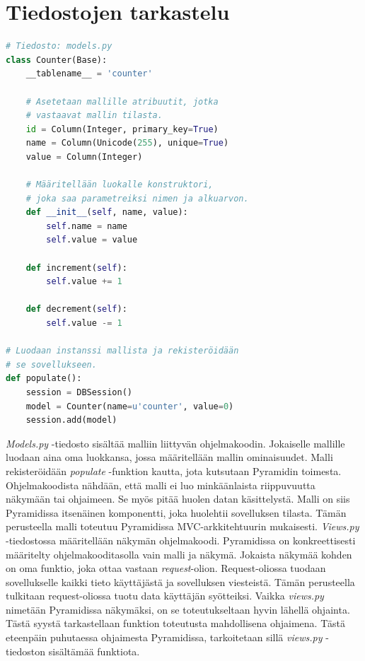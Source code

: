 \documentclass[utf8]{gradu3}
\begin{document}
\section{Tiedostojen tarkastelu}
\lstset{numbers=left}
\begin{lstlisting}[language=Python]
# Tiedosto: models.py
class Counter(Base):
    __tablename__ = 'counter'

    # Asetetaan mallille atribuutit, jotka
    # vastaavat mallin tilasta.
    id = Column(Integer, primary_key=True)
    name = Column(Unicode(255), unique=True)
    value = Column(Integer)

    # Määritellään luokalle konstruktori,
    # joka saa parametreiksi nimen ja alkuarvon.
    def __init__(self, name, value):
        self.name = name
        self.value = value

    def increment(self):
        self.value += 1

    def decrement(self):
        self.value -= 1

# Luodaan instanssi mallista ja rekisteröidään 
# se sovellukseen.
def populate():
    session = DBSession()
    model = Counter(name=u'counter', value=0)
    session.add(model)
\end{lstlisting}
\emph{Models.py} -tiedosto sisältää malliin liittyvän ohjelmakoodin. Jokaiselle mallille luodaan aina oma luokkansa, jossa määritellään mallin ominaisuudet. Malli rekisteröidään \emph{populate} -funktion kautta, jota kutsutaan Pyramidin toimesta.
Ohjelmakoodista nähdään, että malli ei luo minkäänlaista riippuvuutta näkymään tai ohjaimeen. Se myös pitää huolen datan käsittelystä.  Malli on siis Pyramidissa itsenäinen komponentti, joka huolehtii sovelluksen tilasta. Tämän perusteella malli toteutuu Pyramidissa MVC-arkkitehtuurin mukaisesti.
\emph{Views.py} -tiedostossa määritellään näkymän ohjelmakoodi. Pyramidissa on konkreettisesti määritelty ohjelmakooditasolla vain malli ja näkymä.
Jokaista näkymää kohden on oma funktio, joka ottaa vastaan \emph{request}-olion. Request-oliossa tuodaan sovellukselle kaikki tieto käyttäjästä ja sovelluksen viesteistä. Tämän perusteella tulkitaan request-oliossa tuotu data käyttäjän syötteiksi.
Vaikka \emph{views.py} nimetään Pyramidissa näkymäksi, on se toteutukseltaan hyvin lähellä ohjainta. Tästä syystä tarkastellaan funktion toteutusta mahdollisena ohjaimena. Tästä eteenpäin puhutaessa ohjaimesta Pyramidissa, tarkoitetaan sillä \emph{views.py} -tiedoston sisältämää funktiota.
\end{document}
